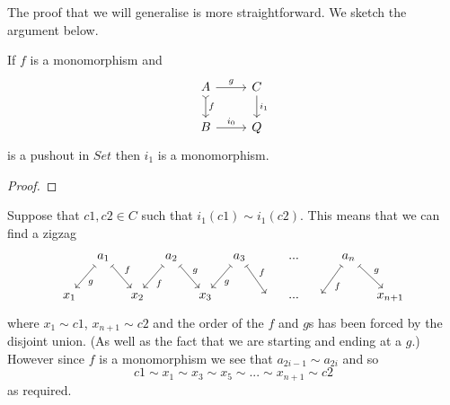 \documentclass{article}
\begin{document}
The proof that we will generalise is more straightforward.
We sketch the argument below.

\begin{lemma}\label{lem:pushout-of-mono-2}
  If $f$ is a monomorphism and
  \begin{equation*}
    \begin{tikzcd}
     A \rar{g} \dar[rightarrowtail]{f} & C\dar{i_1}\\
     B \rar{i_0} & Q
    \end{tikzcd}
  \end{equation*}
  is a pushout in $Set$ then $i_1$ is a monomorphism.
  \begin{proof}

  \end{proof}
  Suppose that $c1,c2\in C$ such that $i_1(c1)\sim i_1(c2)$.
  This means that we can find a zigzag
  \begin{equation*}
    \begin{tikzcd}[column sep=0.3cm]
      {} & a_1 \dlar[mapsto]{g} \drar[mapsto]{f} & {} & a_2 \dlar[mapsto]{f} \drar[mapsto]{g}& {} & a_3 \dlar[mapsto]{g}\drar[mapsto]{f} &{} &...& & a_n \dlar[mapsto]{f}\drar[mapsto]{g} &{} \\
      x_1 & {} & x_2 & {} & x_3 & {} & {} & ...& {}  & {} & x_{n+1}
    \end{tikzcd}
  \end{equation*}
  where $x_1\sim c1$, $x_{n+1}\sim c2$ and the order of the $f$ and $g$s has been forced by the disjoint union.
  (As well as the fact that we are starting and ending at a $g$.)
  However since $f$ is a monomorphism we see that $a_{2i-1}\sim a_{2i}$ and so
  \begin{equation*}
    c1 \sim x_1 \sim x_3 \sim x_5 \sim ... \sim x_{n+1}\sim c2
  \end{equation*}
  as required.
\end{lemma}




\end{document}
